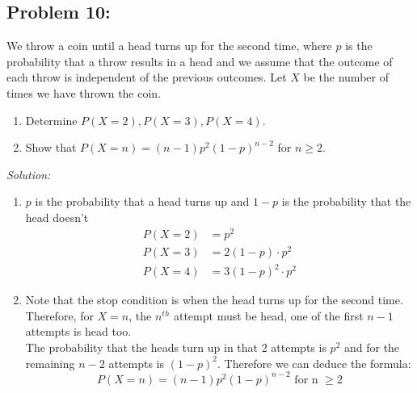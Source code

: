 \documentclass[a4paper]{article}
\begin{document}
\subsection*{Problem 10:}
We throw a coin until a head turns up for the second time, where $p$ is the probability that a throw results in a head and we assume that the outcome of each throw is independent of the previous outcomes. Let $X$ be the number of times we have thrown the coin.
\begin{enumerate}
	\item Determine $P(X = 2), P(X = 3), P(X = 4)$.
	\item Show that $P(X = n) = (n-1) p^2 (1-p)^{n - 2}$ for $n \geq 2$.
\end{enumerate}
\textit{Solution:}
\begin{enumerate}
	\item $p$ is the probability that a head turns up and $1-p$ is the probability that the head doesn't
	      \begin{align*}
		      P(X = 2) & = p^{2}                  \\
		      P(X = 3) & = 2(1-p)\cdot p^{2}      \\
		      P(X = 4) & = 3(1-p)^{2} \cdot p^{2}
	      \end{align*}
	\item Note that the stop condition is when the head turns up for the second time. Therefore, for $X = n$, the $n_{}^{th}$ attempt must be head, one of the first $n-1$ attempts is head too. \\
	      The probability that the heads turn up in that 2 attempts is $p^{2}$ and for the remaining $n-2$ attempts is $(1-p)^{2}$.
	      Therefore we can deduce the formula:
	      \begin{equation*}
		      P(X = n) = (n-1) p^2 (1-p)^{n - 2} \text{ for n } \geq 2
	      \end{equation*}
\end{enumerate}

\end{document}
